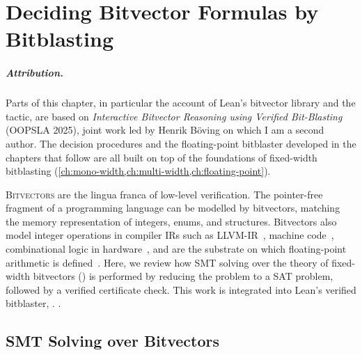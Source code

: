 \chapter{Deciding Bitvector Formulas by Bitblasting}
\label{ch:background-bv}

\paragraph*{Attribution.} Parts of this chapter, in particular the account of
Lean's bitvector library and the \bvdecide{} tactic, are based on
\emph{Interactive Bitvector Reasoning using Verified
Bit-Blasting}~\citep{leanbv} (OOPSLA 2025), joint work led by Henrik Böving on
which I am a second author. The decision procedures and the
floating-point bitblaster developed in the chapters that follow are all built
on top of the foundations of fixed-width bitblasting (\cref{ch:mono-width,ch:multi-width,ch:floating-point}).

\lettrine{B}{itvectors} are the lingua franca of low-level verification.
The pointer-free fragment of a programming language can be modelled by
bitvectors, matching the memory representation of integers, enums, and
structures. Bitvectors also model integer operations in compiler IRs such
as LLVM-IR~\citep{zhao2012formalizing}, machine
code~\citep{armstrong2019isa,reid2016trustworthy}, combinational logic in
hardware~\citep{bourgeat2020essence}, and are the substrate on which
floating-point arithmetic is defined~\citep{boldo2011flocq}.
Here, we review how SMT solving over the theory of fixed-width bitvectors (\qfbv{})
is performed by reducing the problem to a SAT problem,
followed by a verified certificate check.
This work is integrated into Lean's verified bitblaster, \bvdecide{}.
\bvdecide{}.

\section{SMT Solving over Bitvectors}
\label{sec:bg:smt}


